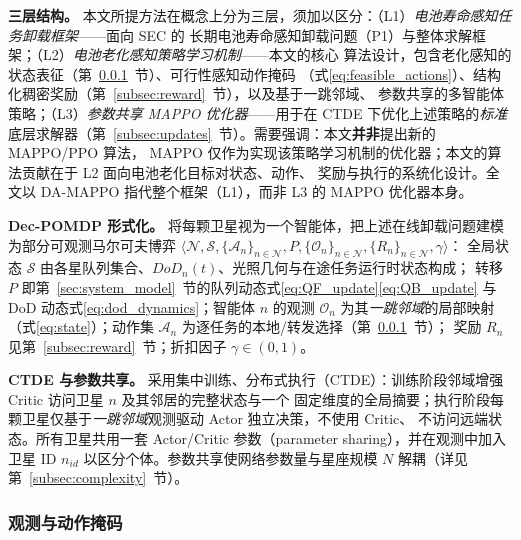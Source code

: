 \documentclass[a4paper,11pt]{article}
\begin{document}
\noindent\textbf{三层结构。}
本文所提方法在概念上分为三层，须加以区分：（L1）\emph{电池寿命感知任务卸载框架}——面向 SEC 的
长期电池寿命感知卸载问题（P1）与整体求解框架；（L2）\emph{电池老化感知策略学习机制}——本文的核心
算法设计，包含老化感知的状态表征（第~\ref{subsec:obs_action}~节）、可行性感知动作掩码
（式\eqref{eq:feasible_actions}）、结构化稠密奖励（第~\ref{subsec:reward}~节），以及基于一跳邻域、
参数共享的多智能体策略；（L3）\emph{参数共享 MAPPO 优化器}——用于在 CTDE 下优化上述策略的\emph{标准}
底层求解器（第~\ref{subsec:updates}~节）。需要强调：本文\textbf{并非}提出新的 MAPPO/PPO 算法，
MAPPO 仅作为实现该策略学习机制的优化器；本文的算法贡献在于 L2 面向电池老化目标对状态、动作、
奖励与执行的系统化设计。全文以 DA-MAPPO 指代整个框架（L1），而非 L3 的 MAPPO 优化器本身。

\noindent\textbf{Dec-POMDP 形式化。}
将每颗卫星视为一个智能体，把上述在线卸载问题建模为部分可观测马尔可夫博弈
$\langle \mathcal{N}, \mathcal{S}, \{\mathcal{A}_n\}_{n\in\mathcal{N}}, P, \{\mathcal{O}_n\}_{n\in\mathcal{N}}, \{R_n\}_{n\in\mathcal{N}}, \gamma \rangle$：
全局状态 $\mathcal{S}$ 由各星队列集合、$DoD_n(t)$、光照几何与在途任务运行时状态构成；
转移 $P$ 即第~\ref{sec:system_model}~节的队列动态式\eqref{eq:QF_update}\eqref{eq:QB_update}
与 DoD 动态式\eqref{eq:dod_dynamics}；智能体 $n$ 的观测 $\mathcal{O}_n$ 为其\emph{一跳邻域}的局部映射
（式\eqref{eq:state}）；动作集 $\mathcal{A}_n$ 为逐任务的本地/转发选择（第~\ref{subsec:obs_action}~节）；
奖励 $R_n$ 见第~\ref{subsec:reward}~节；折扣因子 $\gamma\in(0,1)$。

\noindent\textbf{CTDE 与参数共享。}
采用集中训练、分布式执行（CTDE）：训练阶段邻域增强 Critic 访问卫星 $n$ 及其邻居的完整状态与一个
固定维度的全局摘要；执行阶段每颗卫星仅基于\emph{一跳邻域}观测驱动 Actor 独立决策，不使用 Critic、
不访问远端状态。所有卫星共用一套 Actor/Critic 参数（parameter sharing），并在观测中加入卫星
ID $n_{id}$ 以区分个体。参数共享使网络参数量与星座规模 $N$ 解耦（详见第~\ref{subsec:complexity}~节）。

\subsubsection{观测与动作掩码}
\label{subsec:obs_action}
\end{document}
